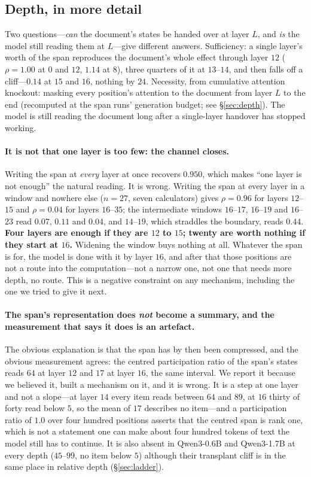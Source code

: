 \documentclass{article}
\begin{document}
\subsection{Depth, in more detail}
\label{app:depth2}

Two questions---\emph{can} the document's states be handed over at layer $L$,
and \emph{is} the model still reading them at $L$---give different answers.
Sufficiency: a single layer's worth of the span reproduces the document's whole
effect through layer $12$ ($\rho = 1.00$ at $0$ and $12$, $1.14$ at $8$), three
quarters of it at $13$--$14$, and then falls off a cliff---$0.14$ at $15$ and
$16$, nothing by $24$. Necessity, from cumulative attention knockout: masking
every position's attention to the document from layer $L$ to the end
(recomputed at the span runs' generation budget; see \S\ref{sec:depth}). The model is still reading the document long after
a single-layer handover has stopped working.

\paragraph{It is not that one layer is too few: the channel closes.} Writing the
span at \emph{every} layer at once recovers $0.950$, which makes ``one layer is
not enough'' the natural reading. It is wrong. Writing the span at every layer
in a window and nowhere else ($n=27$, seven calculators) gives $\rho = 0.96$ for
layers $12$--$15$ and $\rho = 0.04$ for layers $16$--$35$; the intermediate
windows $16$--$17$, $16$--$19$ and $16$--$23$ read $0.07$, $0.11$ and $0.04$,
and $14$--$19$, which straddles the boundary, reads $0.44$. \textbf{Four layers
are enough if they are $12$ to $15$; twenty are worth nothing if they start at
$16$.} Widening the window buys nothing at all. Whatever the span is for, the
model is done with it by layer $16$, and after that those positions are not a
route into the computation---not a narrow one, not one that needs more depth, no
route. This is a negative constraint on any mechanism, including the one we
tried to give it next.

\paragraph{The span's representation does \emph{not} become a summary, and the
measurement that says it does is an artefact.} The obvious explanation is that
the span has by then been compressed, and the obvious measurement agrees: the
centred participation ratio of the span's states reads $64$ at layer $12$ and
$17$ at layer $16$, the same interval. We report it because we believed it,
built a mechanism on it, and it is wrong. It is a step at one layer and not a
slope---at layer $14$ every item reads between $64$ and $89$, at $16$ thirty of
forty read below $5$, so the mean of $17$ describes no item---and a
participation ratio of $1.0$ over four hundred positions asserts that the
centred span is rank one, which is not a statement one can make about four
hundred tokens of text the model still has to continue. It is also absent in
Qwen3-0.6B and Qwen3-1.7B at every depth ($45$--$99$, no item below $5$) although
their transplant cliff is in the same place in relative depth
(\S\ref{sec:ladder}).
\end{document}
